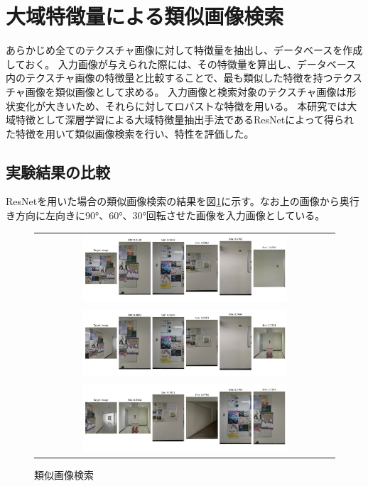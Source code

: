 \documentclass[]{jarticle}          %
\begin{document}
\section{大域特徴量による類似画像検索}
あらかじめ全てのテクスチャ画像に対して特徴量を抽出し、データベースを作成しておく。
入力画像が与えられた際には、その特徴量を算出し、データベース内のテクスチャ画像の特徴量と比較することで、最も類似した特徴を持つテクスチャ画像を類似画像として求める。
入力画像と検索対象のテクスチャ画像は形状変化が大きいため、それらに対してロバストな特徴を用いる。
本研究では大域特徴として深層学習による大域特徴量抽出手法であるResNetによって得られた特徴を用いて類似画像検索を行い、特性を評価した。

\subsection{実験結果の比較}
ResNetを用いた場合の類似画像検索の結果を図\ref{one}に示す。なお上の画像から奥行き方向に左向きに90°、60°、30°回転させた画像を入力画像としている。
\begin{figure}[H]
  \begin{center}
    \begin{tabular}{c}
      \includegraphics[width=0.7\textwidth]{figures/RasNet270.png}\\
      \includegraphics[width=0.7\textwidth]{figures/RasNet300.png}\\
      \includegraphics[width=0.7\textwidth]{figures/RasNet330.png}\\
    \end{tabular}
  \end{center}
  \caption{類似画像検索}
  \label{one}
\end{figure}
\end{document}

